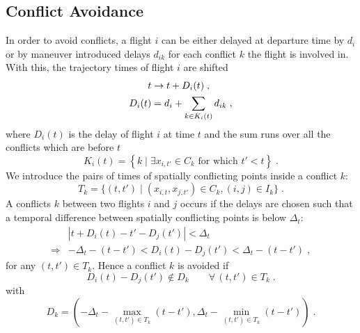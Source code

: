 \subsection{Conflict Avoidance}
In order to avoid conflicts, a flight $i$ can be either delayed at departure time by $d_i$ or by maneuver introduced delays $d_{ik}$ for each conflict $k$ the flight is involved in.
With this, the trajectory times of flight $i$ are shifted
\begin{align}
    t & \to t  + D_i(t) \; , \notag \\
    D_i(t) & = d_i + \sum_{k\in K_{i}(t)} d_{ik} \label{eqn:time_dependent_delay} \; , 
\end{align}
where $D_i(t)$ is the delay of flight $i$ at time $t$ and the sum runs over all the conflicts which are before $t$
\begin{equation*}
    K_{i}(t) = \left\{k \; |  \; \exists x_{i, t'} \in C_k \text{ for which } t' < t  \right\}  \; .
\end{equation*}
We introduce the pairs of times of spatially conflicting points inside a conflict $k$:
\begin{equation*}
    T_k =  \{(t, t') \; | \; (x_{i, t}, x_{j, t'}) \in C_k , (i, j) \in I_k \} \; .
\end{equation*}
A conflicts $k$ between two flights $i$ and $j$ occurs if the delays are chosen such that a temporal difference between spatially conflicting points is below $\Delta_t$:
\begin{align*}
    & |t + D_i(t) - t' - D_j(t')| < \Delta_t \\
    \Rightarrow  & - \Delta_t - (t - t') < D_i(t) - D_j(t') < \Delta_t - (t - t') \; , 
\end{align*}
for any $(t, t') \in T_k$.
Hence a conflict $k$ is avoided if
\begin{equation*}
    D_i(t) - D_j(t') \notin D_k \qquad \forall \, (t, t') \in T_k \; .
\end{equation*}
with
\begin{equation*}
    D_k = \left(-\Delta_t - \max_{(t, t') \in T_k} (t - t'), \Delta_t - \min_{(t, t') \in T_k} (t - t')\right) \; .
\end{equation*}


